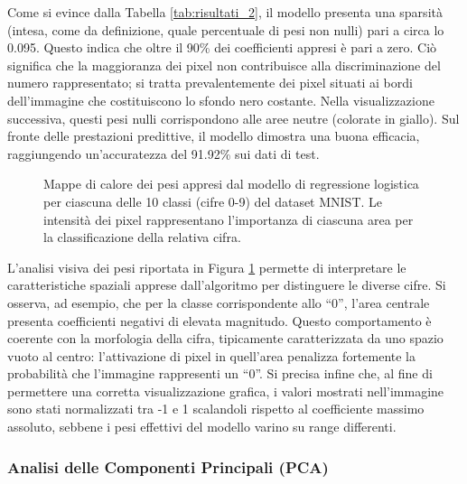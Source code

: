 \documentclass[a4paper,11pt]{article}
\begin{document}
Come si evince dalla Tabella \ref{tab:risultati_2}, il modello presenta una sparsità (intesa, come da definizione, quale percentuale di pesi non nulli) pari a circa lo 0.095. Questo indica che oltre il 90\% dei coefficienti appresi è pari a zero. Ciò significa che la maggioranza dei pixel non contribuisce alla discriminazione del numero rappresentato; si tratta prevalentemente dei pixel situati ai bordi dell'immagine che costituiscono lo sfondo nero costante. Nella visualizzazione successiva, questi pesi nulli corrispondono alle aree neutre (colorate in giallo). Sul fronte delle prestazioni predittive, il modello dimostra una buona efficacia, raggiungendo un'accuratezza del 91.92\% sui dati di test.

\begin{figure}[htbp]
    \centering
    \caption{Mappe di calore dei pesi appresi dal modello di regressione logistica per ciascuna delle 10 classi (cifre 0-9) del dataset MNIST. Le intensità dei pixel rappresentano l'importanza di ciascuna area per la classificazione della relativa cifra.}
    \label{fig:weights_visualization}
\end{figure}

L'analisi visiva dei pesi riportata in Figura \ref{fig:weights_visualization} permette di interpretare le caratteristiche spaziali apprese dall'algoritmo per distinguere le diverse cifre. Si osserva, ad esempio, che per la classe corrispondente allo ``0'', l'area centrale presenta coefficienti negativi di elevata magnitudo. Questo comportamento è coerente con la morfologia della cifra, tipicamente caratterizzata da uno spazio vuoto al centro: l'attivazione di pixel in quell'area penalizza fortemente la probabilità che l'immagine rappresenti un ``0''. Si precisa infine che, al fine di permettere una corretta visualizzazione grafica, i valori mostrati nell'immagine sono stati normalizzati tra -1 e 1 scalandoli rispetto al coefficiente massimo assoluto, sebbene i pesi effettivi del modello varino su range differenti.

\subsubsection*{Analisi delle Componenti Principali (PCA)}
\end{document}
